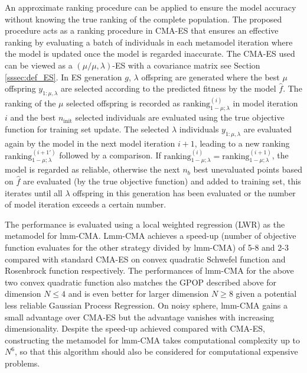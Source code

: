 An approximate ranking procedure can be applied to ensure the model accuracy without knowing the true ranking of the complete population. The proposed procedure acts as a ranking procedure in CMA-ES that ensures an effective ranking by evaluating a batch of individuals in each metamodel iteration where the model is updated once the model is regarded inaccurate. The CMA-ES used can be viewed as a $(\mu/\mu,\lambda)$-ES with a covariance matrix see Section \ref{sssec:def_ES}. In ES generation $g$, $\lambda$ offspring are generated where the best $\mu$ offspring $y_{1:\mu,\lambda}$ are selected according to the predicted fitness by the model $\hat f$. The ranking of the $\mu$ selected offspring is recorded as $\text{ranking}_{1-\mu;\lambda}^{(i)}$ in model iteration $i$ and the best $n_{\text{init}}$ selected individuals are evaluated using the true objective function for training set update. The selected $\lambda$ individuals $y_{1:\mu,\lambda}$ are evaluated again by the model in the next model iteration $i+1$, leading to a new ranking $\text{ranking}_{1-\mu;\lambda}^{(i+1 \prime)}$ followed by a comparison. If $\text{ranking}_{1-\mu;\lambda}^{(i)} = \text{ranking}_{1-\mu;\lambda}^{(i+1)}$, the model is regarded as reliable, otherwise the next $n_b$ best unevaluated points based on $\hat f$ are evaluated (by the true objective function) and added to training set, this iterates until all $\lambda$ offspring in this generation has been evaluated or the number of model iteration exceeds a certain number.  

The performance is evaluated using a local weighted regression (LWR) \cite{atkeson1997locally} as the metamodel for lmm-CMA. Lmm-CMA achieves a speed-up (number of objective function evaluates for the other strategy divided by lmm-CMA) of 5-8 and 2-3 compared with standard CMA-ES \cite{hansen2004evaluating} on convex quadratic Schwefel function and Rosenbrock function respectively. The performances of lmm-CMA for the above two convex quadratic function also matches the GPOP described above for dimension $N\leq 4$ and is even better for larger dimension $N\geq 8$ given a potential less reliable Gaussian Process Regression. On noisy sphere, lmm-CMA gains a small advantage over CMA-ES but the advantage vanishes with increasing dimensionality. Despite the speed-up achieved compared with CMA-ES, constructing the metamodel for lmm-CMA takes computational complexity up to $N^6$, so that this algorithm should also be considered for computational expensive problems. 


